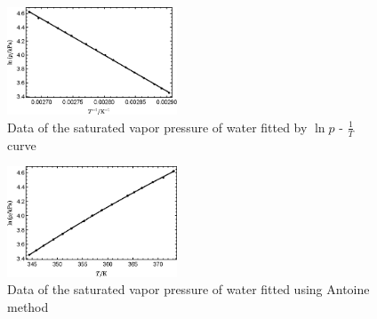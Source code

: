 \documentclass[%
 reprint,
 amsmath,amssymb,
 aps,
10.5pt,
]{revtex4-1}
\begin{document}
\begin{figure}
\centering
\includegraphics[width=0.45\textwidth]{figures/Clausiusfit.eps}
\caption{Data of the saturated vapor pressure of water fitted by $\ln{p}$ - $\frac{1}{T}$ curve}
\label{Clausius}
\end{figure}
\begin{figure}
\centering
\includegraphics[width=0.45\textwidth]{figures/Antoinefit.eps}
\caption{Data of the saturated vapor pressure of water fitted using Antoine method}
\label{Antoine}
\end{figure}
\end{document}
